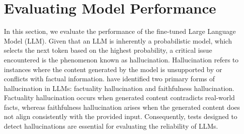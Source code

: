 \section{Evaluating Model Performance}











In this section, we evaluate the performance of the fine-tuned Large Language Model (LLM). Given that an LLM is inherently a probabilistic model, which selects the next token based on the highest probability, a critical issue encountered is the phenomenon known as hallucination. Hallucination refers to instances where the content generated by the model is unsupported by or conflicts with factual information. \cite{huang2025survey} have identified two primary forms of hallucination in LLMs: factuality hallucination and faithfulness hallucination. Factuality hallucination occurs when generated content contradicts real-world facts, whereas faithfulness hallucination arises when the generated content does not align consistently with the provided input. Consequently, tests designed to detect hallucinations are essential for evaluating the reliability of LLMs.



